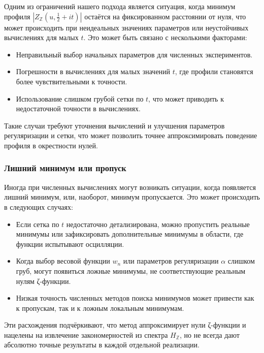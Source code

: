 \documentclass{article}
\numberwithin{equation}{section}
\theoremstyle{plain}
\theoremstyle{definition}
\theoremstyle{remark}
\def\alpha{α}\def\beta{β}\def\gamma{γ}\def\Gamma{Γ}%
\begin{document}
\noindent
Одним из ограничений нашего подхода является ситуация, когда минимум профиля \( |Z_{\mathbb{Z}}(u, \frac{1}{2} + it)| \) остаётся на фиксированном расстоянии от нуля, что может происходить при неидеальных значениях параметров или неустойчивых вычислениях для малых \( t \). Это может быть связано с несколькими факторами:
\begin{itemize}
  \item Неправильный выбор начальных параметров для численных экспериментов.
  \item Погрешности в вычислениях для малых значений \( t \), где профили становятся более чувствительными к точности.
  \item Использование слишком грубой сетки по \( t \), что может приводить к недостаточной точности в вычислениях.
\end{itemize}

Такие случаи требуют уточнения вычислений и улучшения параметров регуляризации и сетки, что может позволить точнее аппроксимировать поведение профиля в окрестности нулей.

\subsubsection{Лишний минимум или пропуск}
\label{subsubsec:extra-or-missed-minimum}

\noindent
Иногда при численных вычислениях могут возникать ситуации, когда появляется лишний минимум, или, наоборот, минимум пропускается. Это может происходить в следующих случаях:
\begin{itemize}
  \item Если сетка по \( t \) недостаточно детализирована, можно пропустить реальные минимумы или зафиксировать дополнительные минимумы в области, где функции испытывают осцилляции.
  \item Когда выбор весовой функции \( w_n \) или параметров регуляризации \( \alpha \) слишком груб, могут появиться ложные минимумы, не соответствующие реальным нулям ζ-функции.
  \item Низкая точность численных методов поиска минимумов может привести как к пропускам, так и к ложным локальным минимумам.
\end{itemize}

Эти расхождения подчёркивают, что метод аппроксимирует нули ζ-функции и нацелены на извлечение закономерностей из спектра \( H_{\mathbb{Z}} \), но не всегда дают абсолютно точные результаты в каждой отдельной реализации.
\end{document}
